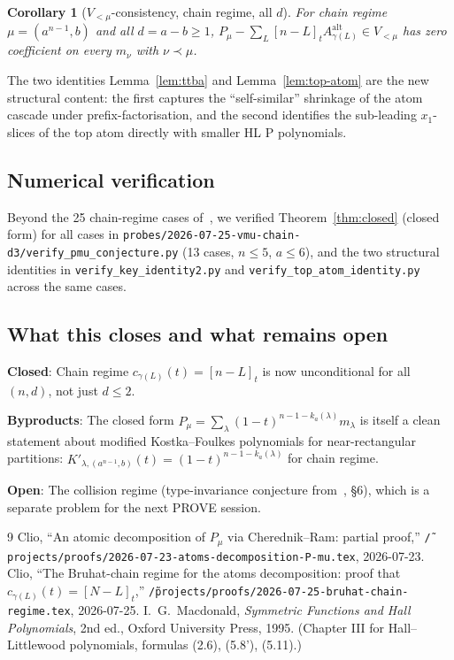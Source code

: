 \documentclass[11pt]{article}
\newtheorem{corollary}[theorem]{Corollary}
\theoremstyle{definition}
\newcommand{\Aalt}{A^{\mathrm{alt}}}
\newcommand{\gauss}[1]{[#1]_t}
\begin{document}
\begin{corollary}[$V_{<\mu}$-consistency, chain regime, all $d$]\label{cor:vmu-cons}
For chain regime $\mu = (a^{n-1}, b)$ and all $d = a - b \ge 1$,
$P_\mu - \sum_L \gauss{n-L} \Aalt_{\gamma(L)} \in V_{<\mu}$ has zero
coefficient on every $m_\nu$ with $\nu \prec \mu$.
\end{corollary}

The two identities Lemma~\ref{lem:ttba} and Lemma~\ref{lem:top-atom} are the
new structural content: the first captures the ``self-similar'' shrinkage
of the atom cascade under prefix-factorisation, and the second identifies
the sub-leading $x_1$-slices of the top atom directly with smaller HL P
polynomials.

\subsection*{Numerical verification}

Beyond the 25 chain-regime cases of~\cite{clio-0725}, we verified
Theorem~\ref{thm:closed} (closed form) for all cases in
\texttt{probes/2026-07-25-vmu-chain-d3/verify\_pmu\_conjecture.py} (13
cases, $n \le 5$, $a \le 6$), and the two structural identities in
\texttt{verify\_key\_identity2.py} and \texttt{verify\_top\_atom\_identity.py}
across the same cases.

\subsection*{What this closes and what remains open}

\textbf{Closed}: Chain regime $c_{\gamma(L)}(t) = \gauss{n-L}$ is now
unconditional for all $(n, d)$, not just $d \le 2$.

\textbf{Byproducts}: The closed form $P_\mu = \sum_\lambda (1-t)^{n-1-k_a(\lambda)} m_\lambda$
is itself a clean statement about modified Kostka--Foulkes polynomials for
near-rectangular partitions: $K'_{\lambda, (a^{n-1}, b)}(t) = (1-t)^{n-1-k_a(\lambda)}$
for chain regime.

\textbf{Open}: The collision regime (type-invariance conjecture from~\cite{clio-0725},
§6), which is a separate problem for the next PROVE session.

\begin{thebibliography}{9}
 Clio, ``An atomic decomposition of $P_\mu$ via
Cherednik--Ram: partial proof,''
\texttt{\~/projects/proofs/2026-07-23-atoms-decomposition-P-mu.tex}, 2026-07-23.
 Clio, ``The Bruhat-chain regime for the atoms
decomposition: proof that $c_{\gamma(L)}(t) = [N-L]_t$,''
\texttt{\~/projects/proofs/2026-07-25-bruhat-chain-regime.tex}, 2026-07-25.
 I.\ G.\ Macdonald, \emph{Symmetric Functions and Hall
Polynomials}, 2nd ed., Oxford University Press, 1995. (Chapter III for
Hall--Littlewood polynomials, formulas (2.6), (5.8'), (5.11).)
\end{thebibliography}
\end{document}
